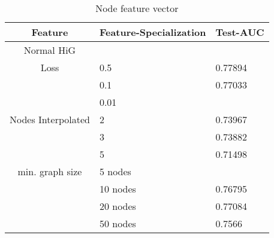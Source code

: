 \begin{table}
    \centering
    \caption{Node feature vector}
    \label{node_features}
    \begin{tabular}{c || l| p{6cm} |}
        Feature & Feature-Specialization& Test-AUC                                                 \\
        \hline
        \hline
        Normal HiG&   &        \\
	\hline
        Loss & 0.5 & 0.77894 \\
             & 0.1 & 0.77033                                               \\
             & 0.01 &                                                \\
	\hline
        Nodes Interpolated & 2             & 0.73967                                                 \\
             & 3            & 0.73882                                                  \\
             & 5                 & 0.71498                              \\
	\hline
            min. graph size & 5 nodes                   &                                                   \\
             & 10 nodes                   & 0.76795    \\
             & 20 nodes                   & 0.77084    \\
             & 50 nodes                   & 0.7566                                                  \\
    \end{tabular}
\end{table}
